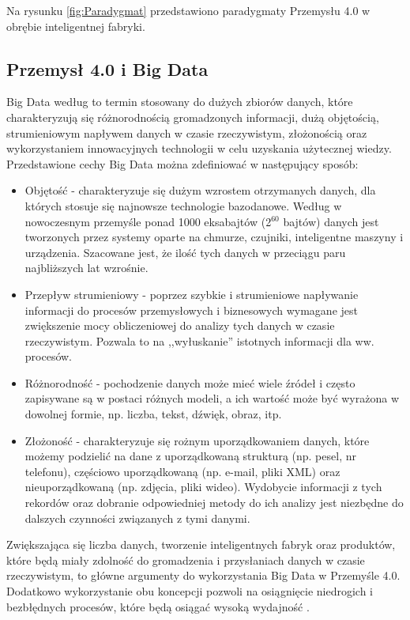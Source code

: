Na rysunku \ref{fig:Paradygmat} przedstawiono paradygmaty Przemysłu 4.0 w obrębie inteligentnej fabryki. 


\subsection{Przemysł 4.0 i Big Data}

Big Data według \cite{BigDataTabakow} to termin stosowany do dużych zbiorów danych, które charakteryzują się różnorodnością gromadzonych informacji, dużą objętością, strumieniowym napływem danych w czasie rzeczywistym, złożonością oraz wykorzystaniem innowacyjnych technologii w celu uzyskania użytecznej wiedzy. Przedstawione cechy Big Data można zdefiniować w następujący sposób: 

\begin{itemize}
	\item Objętość - charakteryzuje się dużym wzrostem otrzymanych danych, dla których stosuje się najnowsze technologie bazodanowe. Według \cite{Industry40} w nowoczesnym przemyśle ponad 1000 eksabajtów (2$^{60}$ bajtów) danych jest tworzonych przez systemy oparte na chmurze, czujniki, inteligentne maszyny i urządzenia. Szacowane jest, że ilość tych danych w przeciągu paru najbliższych lat wzrośnie.
	
	\item Przepływ strumieniowy - poprzez szybkie i strumieniowe napływanie informacji do procesów przemysłowych i biznesowych wymagane jest zwiększenie mocy obliczeniowej do analizy tych danych w czasie rzeczywistym. Pozwala to na ,,wyłuskanie'' istotnych informacji dla ww. procesów.
	
	\item Różnorodność - pochodzenie danych może mieć wiele źródeł i często zapisywane są w postaci różnych modeli, a ich wartość może być wyrażona w dowolnej formie, np. liczba, tekst, dźwięk, obraz, itp.
	
	\item Złożoność - charakteryzuje się rożnym uporządkowaniem danych, które możemy podzielić na dane z uporządkowaną strukturą (np. pesel, nr telefonu), częściowo uporządkowaną (np. e-mail, pliki XML) oraz nieuporządkowaną (np. zdjęcia, pliki wideo). Wydobycie informacji z tych rekordów oraz dobranie odpowiedniej metody do ich analizy jest niezbędne do dalszych czynności związanych z tymi danymi. 
	
\end{itemize} 


Zwiększająca się liczba danych, tworzenie inteligentnych fabryk oraz produktów, które będą miały zdolność do gromadzenia i przysłaniach danych w czasie rzeczywistym, to główne argumenty do wykorzystania Big Data w Przemyśle 4.0. Dodatkowo wykorzystanie obu koncepcji pozwoli na osiągnięcie niedrogich i bezbłędnych procesów, które będą osiągać wysoką wydajność \cite{Industry40}.  


